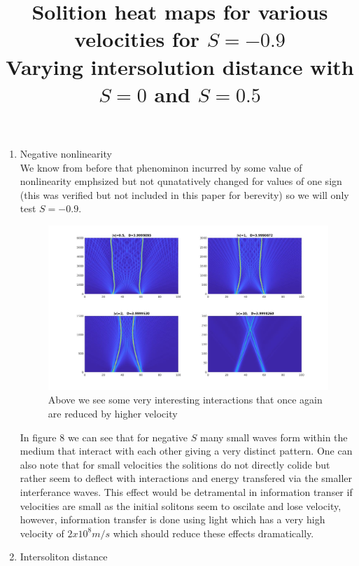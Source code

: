 \documentclass{article}
\begin{document}
\begin{enumerate}
\item Negative nonlinearity \\
We know from before that phenominon incurred by some value of nonlinearity emphsized but not qunatatively changed for values of one sign (this was verified but not included in this paper for berevity) so we will only test $S = -0.9$.

\begin{figure}[htp]
\title{Solition heat maps for various velocities for $S=-0.9$\\}
\includegraphics[scale=0.5,center]{3D_V_Sneg09.jpg}
\caption{Above we see some very interesting interactions that once again are reduced by higher velocity}
\end{figure}
In figure 8 we can see that for negative $S$ many small waves form within the medium that interact with each other giving a very distinct pattern. One can also note that for small velocities the solitions do not directly colide but rather seem to deflect with interactions and energy transfered via the smaller interferance waves. This effect would be detramental in information transer if velocities are small as the initial solitons seem to oscilate and lose velocity, however, information transfer is done using light which has a very high velocity of $2x10^{8} m/s$ which should reduce these effects dramatically. \\
\item Intersoliton distance \\ 
\begin{figure}[htp]
\title{Varying intersolution distance with $S=0$ and $S=0.5$\\}
\subfloat[$S=0$]{
}
\end{figure}
\end{enumerate}
\end{document}
